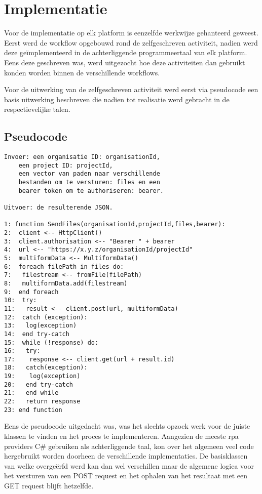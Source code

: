 \section{Implementatie}
Voor de implementatie op elk platform is eenzelfde werkwijze gehanteerd geweest. Eerst werd de \gls{workflow} opgebouwd rond de zelfgeschreven \gls{activiteit}, nadien werd deze geïmplementeerd in de achterliggende programmeertaal van elk platform. Eens deze geschreven was, werd uitgezocht hoe deze \gls{activiteit}en dan gebruikt konden worden binnen de verschillende \gls{workflow}s.

Voor de uitwerking van de zelfgeschreven \gls{activiteit} werd eerst via pseudocode een basis uitwerking beschreven die nadien tot realisatie werd gebracht in de respectievelijke talen.

\subsection{Pseudocode}
\begin{lstlisting}
Invoer: een organisatie ID: organisationId, 
	een project ID: projectId,
	een vector van paden naar verschillende 
	bestanden om te versturen: files en een 
	bearer token om te authoriseren: bearer.
	
Uitvoer: de resulterende JSON.

1: function SendFiles(organisationId,projectId,files,bearer):
2:  client <-- HttpClient()
3:  client.authorisation <-- "Bearer " + bearer
4:  url <-- "https://x.y.z/organisationId/projectId"
5:  multiformData <-- MultiformData()
6:  foreach filePath in files do:
7:   filestream <-- fromFile(filePath)
8:   multiformData.add(filestream)
9:  end foreach
10:  try:
11:   result <-- client.post(url, multiformData)
12:  catch (exception):
13:   log(exception)
14:  end try-catch
15:  while (!response) do:
16:   try:
17:    response <-- client.get(url + result.id)
18:   catch(exception):
19:    log(exception)
20:   end try-catch
21:   end while
22:   return response
23: end function
\end{lstlisting}

Eens de pseudocode uitgedacht was, was het slechts opzoek werk voor de juiste klassen te vinden en het proces te implementeren. Aangezien de meeste \acrshort{rpa} providers C\# gebruiken als achterliggende taal, kon over het algemeen veel code hergebruikt worden doorheen de verschillende implementaties. De basisklassen van welke overgeërfd werd kan dan wel verschillen maar de algemene logica voor het versturen van een POST request en het ophalen van het resultaat met een GET request blijft hetzelfde.

